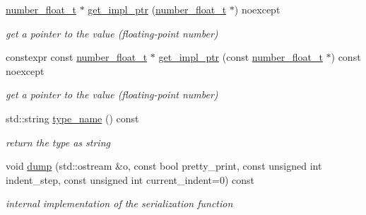 \begin{DoxyCompactItemize}
\hyperlink{classnlohmann_1_1basic__json_a74a0013e847fdc574b48f931f0e757e1}{number\+\_\+float\+\_\+t} $\ast$ \hyperlink{classnlohmann_1_1basic__json_a4044d27206221c274a25cc91e86e02a6}{get\+\_\+impl\+\_\+ptr} (\hyperlink{classnlohmann_1_1basic__json_a74a0013e847fdc574b48f931f0e757e1}{number\+\_\+float\+\_\+t} $\ast$) noexcept
\begin{DoxyCompactList}\small\item\em get a pointer to the value (floating-\/point number) \end{DoxyCompactList}\item 
constexpr const \hyperlink{classnlohmann_1_1basic__json_a74a0013e847fdc574b48f931f0e757e1}{number\+\_\+float\+\_\+t} $\ast$ \hyperlink{classnlohmann_1_1basic__json_acde6699dd3538c0133e70478ce16d8e1}{get\+\_\+impl\+\_\+ptr} (const \hyperlink{classnlohmann_1_1basic__json_a74a0013e847fdc574b48f931f0e757e1}{number\+\_\+float\+\_\+t} $\ast$) const  noexcept
\begin{DoxyCompactList}\small\item\em get a pointer to the value (floating-\/point number) \end{DoxyCompactList}\item 
std\+::string \hyperlink{classnlohmann_1_1basic__json_af08c21af0b281f34a34cdbb31627f4e6}{type\+\_\+name} () const 
\begin{DoxyCompactList}\small\item\em return the type as string \end{DoxyCompactList}\item 
void \hyperlink{classnlohmann_1_1basic__json_a6faae34f557f61f880e05d3a68a81597}{dump} (std\+::ostream \&o, const bool pretty\+\_\+print, const unsigned int indent\+\_\+step, const unsigned int current\+\_\+indent=0) const 
\begin{DoxyCompactList}\small\item\em internal implementation of the serialization function \end{DoxyCompactList}\end{DoxyCompactItemize}
